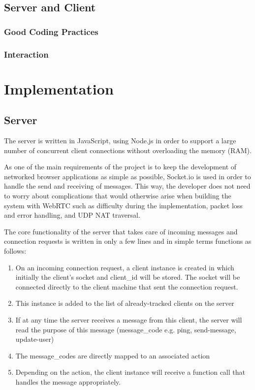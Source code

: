 \documentclass[bsc,frontabs,twoside,singlespacing,parskip,deptreport]{infthesis}     %
\begin{document}
\subsection{Server and Client}

\subsubsection{Good Coding Practices}
\subsubsection{Interaction}

\section{Implementation}
\subsection{Server}
The server is written in JavaScript, using Node.js in order to support a large number of concurrent client connections without overloading the memory (RAM).

As one of the main requirements of the project is to keep the development of networked browser applications as simple as possible, Socket.io is used in order to handle the send and receiving of messages. This way, the developer does not need to worry about complications that would otherwise arise when building the system with WebRTC such as difficulty during the implementation, packet loss and error handling, and UDP NAT traversal.

The core functionality of the server that takes care of incoming messages and connection requests is written in only a few lines and in simple terms functions as follows:

\begin{enumerate}
\item On an incoming connection request, a client instance is created in which initially the client's socket and client\_id will be stored. The socket will be connected directly to the client machine that sent the connection request.
\item This instance is added to the list of already-tracked clients on the server
\item If at any time the server receives a message from this client, the server will read the purpose of this message (message\_code e.g. ping, send-message, update-user)
\item The message\_codes are directly mapped to an associated action
\item Depending on the action, the client instance will receive a function call that handles the message appropriately.
\end{enumerate}
\end{document}
